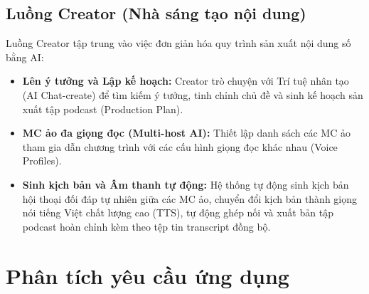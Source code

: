 \documentclass[12pt,a4paper]{report}
\begin{document}
\subsection{Luồng Creator (Nhà sáng tạo nội dung)}
Luồng Creator tập trung vào việc đơn giản hóa quy trình sản xuất nội dung số bằng AI:
\begin{itemize}
    \item \textbf{Lên ý tưởng và Lập kế hoạch:} Creator trò chuyện với Trí tuệ nhân tạo (AI Chat-create) để tìm kiếm ý tưởng, tinh chỉnh chủ đề và sinh kế hoạch sản xuất tập podcast (Production Plan).
    \item \textbf{MC ảo đa giọng đọc (Multi-host AI):} Thiết lập danh sách các MC ảo tham gia dẫn chương trình với các cấu hình giọng đọc khác nhau (Voice Profiles).
    \item \textbf{Sinh kịch bản và Âm thanh tự động:} Hệ thống tự động sinh kịch bản hội thoại đối đáp tự nhiên giữa các MC ảo, chuyển đổi kịch bản thành giọng nói tiếng Việt chất lượng cao (TTS), tự động ghép nối và xuất bản tập podcast hoàn chỉnh kèm theo tệp tin transcript đồng bộ.
\end{itemize}

\section{Phân tích yêu cầu ứng dụng}
\end{document}
